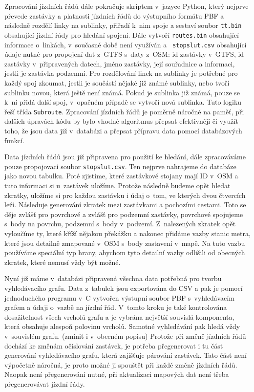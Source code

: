 Zpracování jízdních řádů dále pokračuje skriptem v~jazyce Python, který nejprve
převede zastávky a platnosti jízdních řádů do výstupního formátu PBF a následně
rozdělí linky na sublinky, přiřadí k~nim spoje a sestaví soubor {\tt tt.bin}
obsahující jízdní řády pro hledání spojení. Dále vytvoří {\tt routes.bin}
obsahující informace o~linkách, v~současné době není využíván a {\tt
stopslut.csv} obsahující údaje nutné pro propojení dat z~GTFS s~daty z~OSM: id
zastávky v~GTFS, id zastávky v~připravených datech, jméno zastávky, její
souřadnice a informaci, jestli je zastávka podzemní. Pro rozdělování linek na
sublinky je potřebné pro každý spoj zkoumat, jestli je součástí nějaké již známé
sublinky, nebo tvoří sublinku novou, která ještě není známá. Pokud je sublinka
již známá, pouze se k~ní přidá další spoj, v~opačném případě se vytvoří nová
sublinka. Tuto logiku řeší třída {\tt Subroute}. Zpracování jízdních řádů je
poměrně náročné na paměť, při dalších úpravách kódu by bylo vhodné algoritmus
přepsat efektivněji či využít toho, že jsou data již v~databázi a přepsat
přípravu data pomocí databázových funkcí.  

Data jízdních řádů jsou již připravena pro použití ke hledání, dále zpracováváme
pouze propojovací soubor {\tt stopslut.csv}. Ten nejprve nahrajeme do databáze
jako novou tabulku. Poté zjistíme, které zastávkové stojany mají ID v~OSM a tuto
informaci si u~zastávek uložíme. Protože následně budeme opět hledat zkratky,
uložíme si pro každou zastávku i údaj o~tom, ve kterých dvou čtvercích leží.  
Následuje generování zkratek mezi zastávkami a pochozími cestami. Toto se děje
zvlášť pro povrchové a zvlášť pro podzemní zastávky, povrchové spojujeme s~body
na povrchu, podzemní s~body v~podzemí. Z~nalezených zkratek opět vyloučíme ty,
které kříží nějakou překážku a nakonec přidáme vazby stanic metra, které jsou
detailně zmapované v~OSM s~body zastavení v~mapě. Na tuto vazbu používáme
speciální typ hrany, abychom tyto detailní vazby odlišili od obecných zkratek,
které nemusí vždy být možné. 

Nyní již máme v~databázi připravená všechna data potřebná pro tvorbu
vyhledávacího grafu. Data z~tabulek jsou exportována do CSV a pak je pomocí
jednoduchého programu v~C vytvořen výstupní soubor PBF s~vyhledávacím grafem a
údaji o~vazbě na jízdní řád. V~tomto kroku je také kontrolována dosažitelnost
všech vrcholů grafu a je vybrána největší souvislá komponenta, která obsahuje
alespoň polovinu vrcholů. Samotné vyhledávání pak hledá vždy v~souvislém grafu.
(\TODO zmínit i v~obecném popisu) Protože při změně jízdních řádů dochází ke změnám
očíslování zastávek, je potřeba přegenerovat i tu část generování vyhledávacího
grafu, která zajišťuje párování zastávek. Tato část není výpočetně náročná, je
proto možné ji spouštět při každé změně jízdních řádů. Naopak není přegenerování
nutné, při aktualizaci mapových dat není třeba přegenerovávat jízdní řády. 

